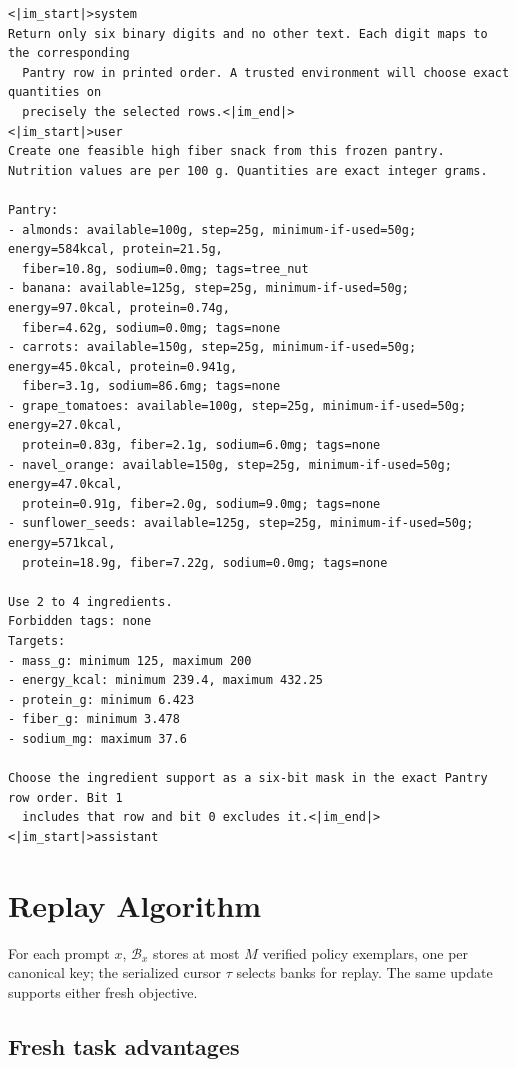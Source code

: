 \begin{Verbatim}[fontsize=\scriptsize,frame=single,framesep=4pt,rulecolor=\color{black!25}]
<|im_start|>system
Return only six binary digits and no other text. Each digit maps to the corresponding
  Pantry row in printed order. A trusted environment will choose exact quantities on
  precisely the selected rows.<|im_end|>
<|im_start|>user
Create one feasible high fiber snack from this frozen pantry.
Nutrition values are per 100 g. Quantities are exact integer grams.

Pantry:
- almonds: available=100g, step=25g, minimum-if-used=50g; energy=584kcal, protein=21.5g,
  fiber=10.8g, sodium=0.0mg; tags=tree_nut
- banana: available=125g, step=25g, minimum-if-used=50g; energy=97.0kcal, protein=0.74g,
  fiber=4.62g, sodium=0.0mg; tags=none
- carrots: available=150g, step=25g, minimum-if-used=50g; energy=45.0kcal, protein=0.941g,
  fiber=3.1g, sodium=86.6mg; tags=none
- grape_tomatoes: available=100g, step=25g, minimum-if-used=50g; energy=27.0kcal,
  protein=0.83g, fiber=2.1g, sodium=6.0mg; tags=none
- navel_orange: available=150g, step=25g, minimum-if-used=50g; energy=47.0kcal,
  protein=0.91g, fiber=2.0g, sodium=9.0mg; tags=none
- sunflower_seeds: available=125g, step=25g, minimum-if-used=50g; energy=571kcal,
  protein=18.9g, fiber=7.22g, sodium=0.0mg; tags=none

Use 2 to 4 ingredients.
Forbidden tags: none
Targets:
- mass_g: minimum 125, maximum 200
- energy_kcal: minimum 239.4, maximum 432.25
- protein_g: minimum 6.423
- fiber_g: minimum 3.478
- sodium_mg: maximum 37.6

Choose the ingredient support as a six-bit mask in the exact Pantry row order. Bit 1
  includes that row and bit 0 excludes it.<|im_end|>
<|im_start|>assistant
\end{Verbatim}


\section{Replay Algorithm}
\label{app:algorithm}
\label{app:replay-objective}

For each prompt $x$, $\mathcal B_x$ stores at most $M$ verified policy
exemplars, one per canonical key; the serialized cursor $\tau$ selects
banks for replay. The same update supports either fresh objective.

\subsection{Fresh task advantages}
\label{app:binary-maxrl}

